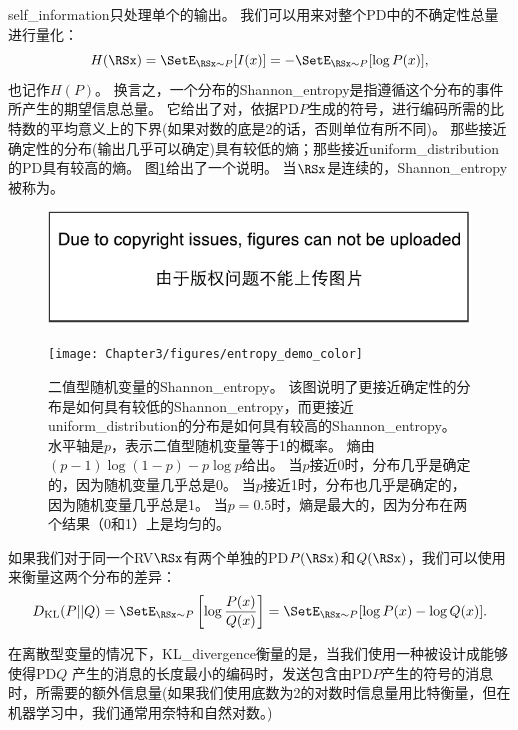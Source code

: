 \gls{self_information}只处理单个的输出。
我们可以用来对整个\gls{PD}中的不确定性总量进行量化：
\begin{equation}
H(\RSx) = \SetE_{\RSx \sim P}[I(x)] = -\SetE_{\RSx \sim P}[\log P(x)],
\end{equation}
也记作$H(P)$。
换言之，一个分布的\gls{Shannon_entropy}是指遵循这个分布的事件所产生的期望信息总量。
它给出了对，依据\gls{PD}$P$生成的符号，进行编码所需的比特数的平均意义上的下界(如果对数的底是2的话，否则单位有所不同)。
那些接近确定性的分布(输出几乎可以确定)具有较低的熵；那些接近\gls{uniform_distribution}的\gls{PD}具有较高的熵。
图\ref{fig:chap3_entropy_demo_color}给出了一个说明。
当$\RSx$是连续的，\gls{Shannon_entropy}被称为。
\begin{figure}[!htb]
\ifOpenSource
\centerline{\includegraphics{figure.pdf}}
\else
\centerline{\texttt{[image: Chapter3/figures/entropy\_demo\_color]}}
\fi
\captionsetup{singlelinecheck=off}
\caption{二值型随机变量的\gls{Shannon_entropy}。%
该图说明了更接近确定性的分布是如何具有较低的\gls{Shannon_entropy}，而更接近\gls{uniform_distribution}的分布是如何具有较高的\gls{Shannon_entropy}。
水平轴是$p$，表示二值型随机变量等于1的概率。
熵由$(p-1)\log(1-p) - p\log p$给出。
当$p$接近0时，分布几乎是确定的，因为随机变量几乎总是0。
当$p$接近1时，分布也几乎是确定的，因为随机变量几乎总是1。
当$p = 0.5$时，熵是最大的，因为分布在两个结果（0和1）上是均匀的。}
\label{fig:chap3_entropy_demo_color}
\end{figure}



如果我们对于同一个\gls{RV}$\RSx$有两个单独的\gls{PD}$P(\RSx)$和$Q(\RSx)$，我们可以使用来衡量这两个分布的差异：
\begin{equation}
D_{\text{KL}}(P||Q) = \SetE_{\RSx \sim P} \left [  \log \frac{P(x)}{Q(x)} \right ] = \SetE_{\RSx \sim P} [\log P(x) - \log Q(x)].
\end{equation}

在离散型变量的情况下，\gls{KL_divergence}衡量的是，当我们使用一种被设计成能够使得\gls{PD}$Q$ 产生的消息的长度最小的编码时，发送包含由\gls{PD}$P$产生的符号的消息时，所需要的额外信息量(如果我们使用底数为2的对数时信息量用比特衡量，但在机器学习中，我们通常用奈特和自然对数。)

